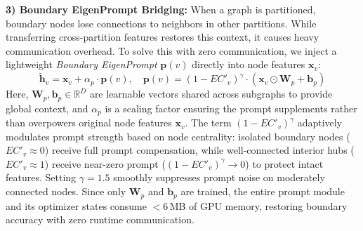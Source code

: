 \textbf{3) Boundary EigenPrompt Bridging:}
When a graph is partitioned, boundary nodes lose connections to neighbors in other partitions. While transferring cross-partition features restores this context, it causes heavy communication overhead. To solve this with zero communication, we inject a lightweight \textit{Boundary EigenPrompt} $\mathbf{p}(v)$ directly into node features $\mathbf{x}_v$:
{\setlength{\abovedisplayskip}{2pt}\setlength{\belowdisplayskip}{2pt}
\begin{equation} \label{eq:prompt}
\mathbf{\tilde{h}}_v = \mathbf{x}_v + \alpha_p \cdot \mathbf{p}(v), \quad \mathbf{p}(v) = (1 - EC'_v)^\gamma \cdot (\mathbf{x}_v \odot \mathbf{W}_p + \mathbf{b}_p)
\end{equation}}
Here, $\mathbf{W}_p, \mathbf{b}_p \in \mathbb{R}^D$ are learnable vectors shared across subgraphs to provide global context, and $\alpha_p$ is a scaling factor ensuring the prompt supplements rather than overpowers original node features $\mathbf{x}_v$. The term $(1 - EC'_v)^\gamma$ adaptively modulates prompt strength based on node centrality: isolated boundary nodes ($EC'_v \approx 0$) receive full prompt compensation, while well-connected interior hubs ($EC'_v \approx 1$) receive near-zero prompt ($(1 - EC'_v)^\gamma \to 0$) to protect intact features. Setting $\gamma = 1.5$ smoothly suppresses prompt noise on moderately connected nodes. Since only $\mathbf{W}_p$ and $\mathbf{b}_p$ are trained, the entire prompt module and its optimizer states consume $<6$\,MB of GPU memory, restoring boundary accuracy with zero runtime communication.
